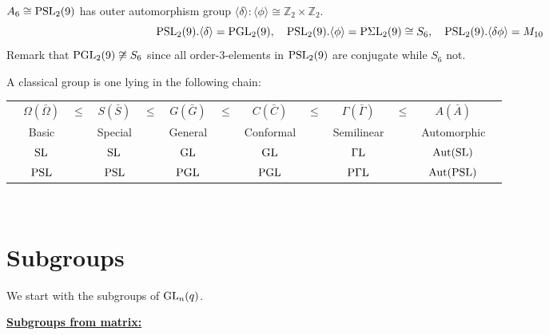 \documentclass[a4paper,11pt]{article}
\def\subtitle#1{\section{#1}}
\begin{document}
\begin{example}
    $A_6\cong \mathrm{PSL}_2(9)$ has outer automorphism group $\langle\delta\rangle:\langle\phi\rangle\cong\mathbb{Z}_2\times\mathbb{Z}_2$.
    \[ \mathrm{PSL}_2(9).\langle\delta\rangle=\mathrm{PGL}_2(9),\quad \mathrm{PSL}_2(9).\langle\phi\rangle=\mathrm{P\Sigma L}_2(9)\cong S_6,\quad \mathrm{PSL}_2(9).\langle\delta\phi\rangle=M_{10} \]
    Remark that $\mathrm{PGL}_2(9)\not\cong S_6$ since all order-3-elements in $\mathrm{PSL}_2(9)$ are conjugate while $S_6$ not.
\end{example}

\begin{definition} A classical group is one lying in the following chain:
    \begin{table*}[htbp]
        \centering
        \begin{tabular}{ccccccccccccc}
            &$\Omega (\bar{\Omega}) $&$\leq$&$ S (\bar{S}) $&$\leq $&$G (\bar{G})$&$\leq $&$C (\bar{C})$&$\leq $&$\Gamma (\bar{\Gamma})$&$\leq $&$A (\bar{A})$\\
            &Basic & & Special & & General & & Conformal & & Semilinear & & Automorphic \\ \midrule
            & $\mathrm{SL}$ & & $\mathrm{SL}$ & & $\mathrm{GL}$ & & $\mathrm{GL}$ & & $\mathrm{\Gamma L}$ & & $\mathrm{Aut}(\mathrm{SL})$ \\
            &$\mathrm{PSL}$ & & $\mathrm{PSL}$ & & $\mathrm{PGL}$ & & $\mathrm{PGL}$ & & $\mathrm{P\Gamma L}$ & & $\mathrm{Aut}(\mathrm{PSL})$ 
        \end{tabular}
    \end{table*}
\end{definition}
\ 

\newpage




\subtitle{Subgroups}

We start with the subgroups of $\mathrm{GL}_n(q)$.

\noindent\textbf{\underline{Subgroups from matrix:}}
\end{document}

